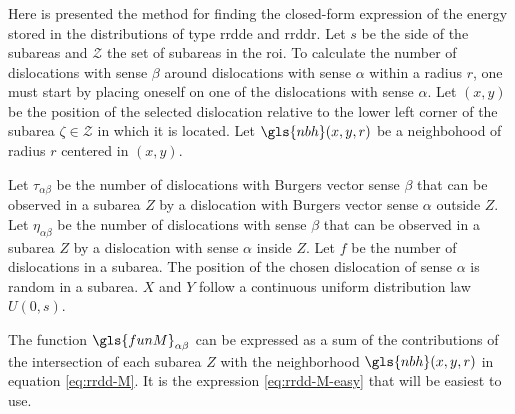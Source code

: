 %
%
%

\subsubsection{}

Here is presented the method for finding the closed-form expression of the energy stored in the distributions of type \gls{rrdde} and \gls{rrddr}.
Let \( s \) be the side of the subareas and \( \mathcal{Z} \) the set of subareas in the \gls{roi}.
To calculate the number of dislocations with sense \( \beta \) around dislocations with sense \( \alpha \) within a radius \( r \), one must start by placing oneself on one of the dislocations with sense \( \alpha \).
Let \( (x, y) \) be the position of the selected dislocation relative to the lower left corner of the subarea \( \zeta \in \mathcal{Z} \) in which it is located.
Let \( \gls{nbh}(x, y, r) \) be a neighbohood of radius \( r \) centered in \( (x, y) \).


Let \( \tau_{\alpha \beta} \) be the number of dislocations with Burgers vector sense \( \beta \) that can be observed in a subarea \( Z \) by a dislocation with Burgers vector sense \( \alpha \) outside \( Z \).
Let \( \eta_{\alpha \beta} \) be the number of dislocations with sense \( \beta \) that can be observed in a subarea \( Z \) by a dislocation with sense \( \alpha \) inside \( Z \).
Let \( f \) be the number of dislocations in a subarea.
The position of the chosen dislocation of sense \( \alpha \) is random in a subarea.
\( X \) and \( Y \) follow a continuous uniform distribution law \( U(0, s) \).

\newpage

The function \( \gls{funM}_{\alpha \beta} \) can be expressed as a sum of the contributions of the intersection of each subarea \( Z \) with the neighborhood \( \gls{nbh}(x, y, r) \) in equation \eqref{eq:rrdd-M}.
It is the expression \eqref{eq:rrdd-M-easy} that will be easiest to use.

